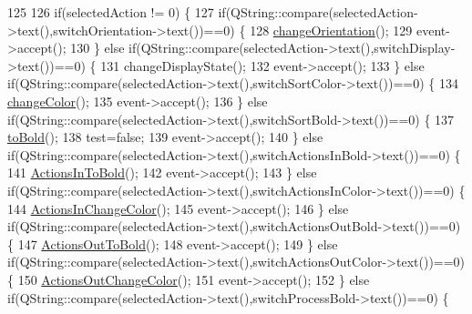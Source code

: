 \begin{DoxyCode}
125 
126         \textcolor{keywordflow}{if}(selectedAction != 0) \{
127             \textcolor{keywordflow}{if}(QString::compare(selectedAction->text(),switchOrientation->text())==0) \{
128                 \hyperlink{classGSort_af6e2d5c0135d55f8a152ba58fc20f9f2}{changeOrientation}();
129                 \textcolor{keyword}{event}->accept();
130             \} \textcolor{keywordflow}{else} \textcolor{keywordflow}{if}(QString::compare(selectedAction->text(),switchDisplay->text())==0) \{
131                 changeDisplayState();
132                 \textcolor{keyword}{event}->accept();
133             \} \textcolor{keywordflow}{else} \textcolor{keywordflow}{if}(QString::compare(selectedAction->text(),switchSortColor->text())==0) \{
134                 \hyperlink{classGSort_aa4c1345a701c975b34de5405bf4d1ab8}{changeColor}();
135                 \textcolor{keyword}{event}->accept();
136             \} \textcolor{keywordflow}{else} \textcolor{keywordflow}{if}(QString::compare(selectedAction->text(),switchSortBold->text())==0) \{
137                 \hyperlink{classGSort_a949ab093cfc0c732777eb086eab4f14d}{toBold}();
138                 test=\textcolor{keyword}{false};
139                 \textcolor{keyword}{event}->accept();
140             \} \textcolor{keywordflow}{else} \textcolor{keywordflow}{if}(QString::compare(selectedAction->text(),switchActionsInBold->text())==0) \{
141                 \hyperlink{classGSort_a2b6ddd556e6314b3a5be157c41be2c05}{ActionsInToBold}();
142                 \textcolor{keyword}{event}->accept();
143             \} \textcolor{keywordflow}{else} \textcolor{keywordflow}{if}(QString::compare(selectedAction->text(),switchActionsInColor->text())==0) \{
144                 \hyperlink{classGSort_a6db06cbba4b129e8dc437f26782ae6a1}{ActionsInChangeColor}();
145                 \textcolor{keyword}{event}->accept();
146             \} \textcolor{keywordflow}{else} \textcolor{keywordflow}{if}(QString::compare(selectedAction->text(),switchActionsOutBold->text())==0) \{
147                 \hyperlink{classGSort_ae09c5f8af47355ef2328e28fa4d4e834}{ActionsOutToBold}();
148                 \textcolor{keyword}{event}->accept();
149             \} \textcolor{keywordflow}{else} \textcolor{keywordflow}{if}(QString::compare(selectedAction->text(),switchActionsOutColor->text())==0) \{
150                 \hyperlink{classGSort_a6a8db6207e236cef662c54b7432f7aca}{ActionsOutChangeColor}();
151                 \textcolor{keyword}{event}->accept();
152             \} \textcolor{keywordflow}{else} \textcolor{keywordflow}{if}(QString::compare(selectedAction->text(),switchProcessBold->text())==0) \{

\end{DoxyCode}
